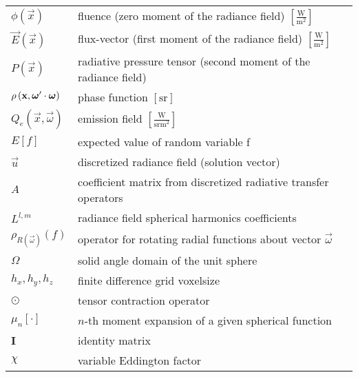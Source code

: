 \begin{flushleft}
\begin{longtable}[c]{@{}p{28.5mm}@{} p{120.5mm}}
	\\
	$\phi\left(\vec{x}\right)$	&  fluence (zero moment of the radiance field) $\left[\frac{\si{\watt}}{\si{\meter}^2}\right]$
	\\
	$\vec{E}\left(\vec{x}\right)$	&  flux-vector (first moment of the radiance field) $\left[\frac{\si{\watt}}{\si{\meter}^2}\right]$
	\\
	$P\left(\vec{x}\right)$	&  radiative pressure tensor (second moment of the radiance field)
	\\
	$\rho\left(\boldsymbol{\mathbf{x}}, \boldsymbol{\mathbf{\omega}}'\cdot\boldsymbol{\mathbf{\omega}}\right)$	&  phase function $\left[\si{\steradian}\right]$
	\\
	$Q_e\left(\vec{x}, \vec{\omega}\right)$	&  emission field $\left[\frac{\si{\watt}}{\si{\steradian} \si{\meter}^2}\right]$
	\\
	$E\left[f\right]$	&  expected value of random variable f
	\\
	$\vec{u}$	&  discretized radiance field (solution vector)
	\\
	$A$	&  coefficient matrix from discretized radiative transfer operators
	\\
	$L^{l,m}$	&  radiance field spherical harmonics coefficients
	\\
	$\rho_{R\left(\vec{\omega}\right)}\left(f\right)$	&  operator for rotating radial functions about vector $\vec{\omega}$
	\\
	$\Omega$	&  solid angle domain of the unit sphere
	\\
	$h_x, h_y, h_z$	&  finite difference grid voxelsize
	\\
	$\odot$	&  tensor contraction operator
	\\
	$\mu_n\left[\cdot\right]$	&  $n$-th moment expansion of a given spherical function
	\\
	$\mathbf{I}$	&  identity matrix
	\\
	$\chi$	&  variable Eddington factor
\end{longtable}
\end{flushleft}
%
%